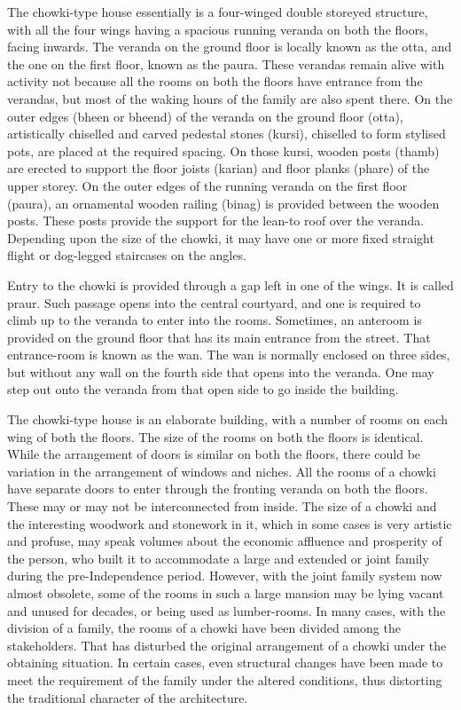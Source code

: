 The chowki-type house essentially is a four-winged double storeyed structure, with all the four wings having a spacious running veranda on both the floors, facing inwards. The veranda on the ground floor is locally known as the otta, and the one on the first floor, known as the paura. These verandas remain alive with activity not because all the rooms on both the floors have entrance from the verandas, but most of the waking hours of the family are also spent there. On the outer edges (bheen or bheend) of the veranda on the ground floor (otta), artistically chiselled and carved pedestal stones (kursi), chiselled to form stylised pots, are placed at the required spacing. On those kursi, wooden posts (thamb) are erected to support the floor joists (karian) and floor planks (phare) of the upper storey. On the outer edges of the running veranda on the first floor (paura), an ornamental wooden railing (binag) is provided between the wooden posts. These posts provide the support for the lean-to roof over the veranda. Depending upon the size of the chowki, it may have one or more fixed straight flight or dog-legged staircases on the angles.

Entry to the chowki is provided through a gap left in one of the wings. It is called praur. Such passage opens into the central courtyard, and one is required to climb up to the veranda to enter into the rooms. Sometimes, an anteroom is provided on the ground floor that has its main entrance from the street. That entrance-room is known as the wan. The wan is normally enclosed on three sides, but without any wall on the fourth side that opens into the veranda. One may step out onto the veranda from that open side to go inside the building.

The chowki-type house is an elaborate building, with a number of rooms on each wing of both the floors. The size of the rooms on both the floors is identical. While the arrangement of doors is similar on both the floors, there could be variation in the arrangement of windows and niches. All the rooms of a chowki have separate doors to enter through the fronting veranda on both the floors. These may or may not be interconnected from inside. The size of a chowki and the interesting woodwork and stonework in it, which in some cases is very artistic and profuse, may speak volumes about the economic affluence and prosperity of the person, who built it to accommodate a large and extended or joint family during the pre-Independence period. However, with the joint family system now almost obsolete, some of the rooms in such a large mansion may be lying vacant and unused for decades, or being used as lumber-rooms. In many cases, with the division of a family, the rooms of a chowki have been divided among the stakeholders. That has disturbed the original arrangement of a chowki under the obtaining situation. In certain cases, even structural changes have been made to meet the requirement of the family under the altered conditions, thus distorting the traditional character of the architecture.

